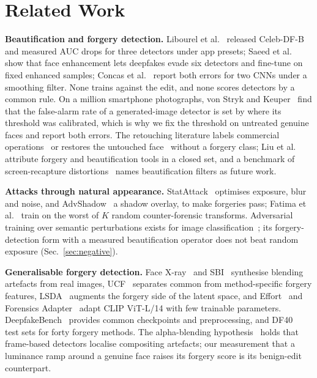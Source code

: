 \documentclass[conference]{IEEEtran}
\begin{document}
\section{Related Work}
\textbf{Beautification and forgery detection.} Libourel et al.~\cite{libourel2024} released Celeb-DF-B and measured AUC
drops for three detectors under app presets; Saeed et al.~\cite{saeed2025} show that face enhancement lets deepfakes evade
six detectors and fine-tune on fixed enhanced samples; Concas et al.~\cite{concas2025} report both errors for two CNNs
under a smoothing filter. None trains against the edit, and none scores detectors by a common rule. On a million
smartphone photographs, von Stryk and Keuper~\cite{laionmobile2026} find that the false-alarm rate of a generated-image
detector is set by where its threshold was calibrated, which is why we fix the threshold on untreated genuine faces and
report both errors. The retouching literature labels commercial operations~\cite{retouchingffhq} or restores the
untouched face~\cite{frrffusion,mofrr,reface,wang2019photoshop} without a forgery class; Liu et al.~\cite{miea2026}
attribute forgery and beautification tools in a closed set, and a benchmark of screen-recapture
distortions~\cite{moire2025} names beautification filters as future work.

\textbf{Attacks through natural appearance.} StatAttack~\cite{statattack2023} optimises exposure, blur and noise, and
AdvShadow~\cite{advshadow2024} a shadow overlay, to make forgeries pass; Fatima et al.~\cite{fatima2025} train on the
worst of $K$ random counter-forensic transforms. Adversarial training over semantic perturbations exists for image
classification~\cite{hosseini2018,laidlaw2019,gat2023,ava2021}; its forgery-detection form with a measured
beautification operator does not beat random exposure (Sec.~\ref{sec:negative}).

\textbf{Generalisable forgery detection.} Face X-ray~\cite{facexray} and SBI~\cite{sbi} synthesise blending artefacts
from real images, UCF~\cite{ucf} separates common from method-specific forgery features, LSDA~\cite{lsda} augments the
forgery side of the latent space, and Effort~\cite{effort} and Forensics Adapter~\cite{forensicsadapter} adapt CLIP
ViT-L/14 with few trainable parameters. DeepfakeBench~\cite{deepfakebench} provides common checkpoints and
preprocessing, and DF40~\cite{df40} test sets for forty forgery methods. The alpha-blending
hypothesis~\cite{alphablend2026} holds that frame-based detectors localise compositing artefacts; our measurement that
a luminance ramp around a genuine face raises its forgery score is its benign-edit counterpart.
\end{document}
